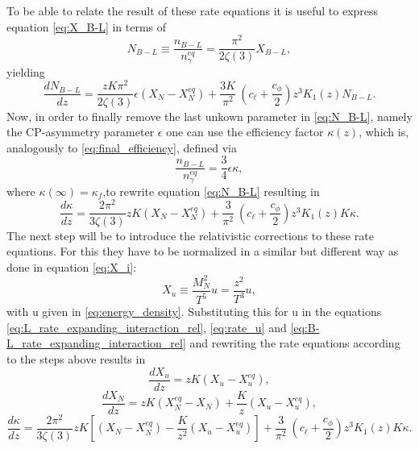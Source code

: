 To be able to relate the result of these rate equations it is useful to express equation \eqref{eq:X_B-L} in terms of
\begin{equation}
	N_{B-L}\equiv\frac{n_{B-L}}{n_\gamma^{eq}}=\frac{\pi^2}{2\zeta(3)}X_{B-L},
\end{equation}
yielding
\begin{equation}
\frac{dN_{B-L}}{dz}=\frac{zK\pi^2}{2\zeta(3)}\epsilon\left(X_N-X_N^{eq}\right)+\frac{3K}{\pi^2}\:\left(c_\ell+\frac{c_\phi}{2}\right)z^3K_1(z)N_{B-L}.
\label{eq:N_B-L}
\end{equation}
Now, in order to finally remove the last unkown parameter in \eqref{eq:N_B-L}, namely the CP-asymmetry parameter $\epsilon$ one can use the efficiency factor $\kappa(z)$, which is, analogously to \eqref{eq:final_efficiency}, defined via
\begin{equation}
	\frac{n_{B-L}}{n_\gamma^{eq}}=\frac{3}{4}\epsilon\kappa,
	\label{eq:efficiency}
\end{equation} 
where $\kappa(\infty)=\kappa_f$,to rewrite equation \eqref{eq:N_B-L} resulting in
\begin{equation}
\frac{d\kappa}{dz}=\frac{2\pi^2}{3\zeta(3)}zK\left(X_N-X_N^{eq}\right)+\frac{3}{\pi^2}\:\left(c_\ell+\frac{c_\phi}{2}\right)z^3K_1(z)K\kappa.
\label{eq:kappa}
\end{equation}
The next step will be to introduce the relativistic corrections to these rate equations. For this they have to be normalized in a similar but different way as done in equation \eqref{eq:X_i}\cite[Eq. (7.9)]{Wormann:2016yyi}:
\begin{equation}
	X_u\equiv\frac{M_N^2}{T^5}u=\frac{z^2}{T^3}u,
	\label{eq:X_u}
\end{equation}
with u given in \eqref{eq:energy_density}.\newline \indent
Substituting this for u in the equations \eqref{eq:L_rate_expanding_interaction_rel}, \eqref{eq:rate_u} and \eqref{eq:B-L_rate_expanding_interaction_rel} and rewriting the rate equations according to the steps above results in\cite[p. 47]{Wormann:2016yyi}
\begin{equation}
\frac{dX_u}{dz}=zK\left(X_u-X_u^{eq}\right),
\end{equation}
\begin{equation}
\frac{dX_N}{dz}=zK\left(X_N^{eq}-X_N\right)+\frac{K}{z}\left(X_u-X_u^{eq}\right),
\end{equation}
\begin{equation}
\frac{d\kappa}{dz}=\frac{2\pi^2}{3\zeta(3)}zK\left[\left(X_N-X_N^{eq}\right)-\frac{K}{z^2}\left(X_u-X_u^{eq}\right)\right]+\frac{3}{\pi^2}\:\left(c_\ell+\frac{c_\phi}{2}\right)z^3K_1(z)K\kappa.
\end{equation}
